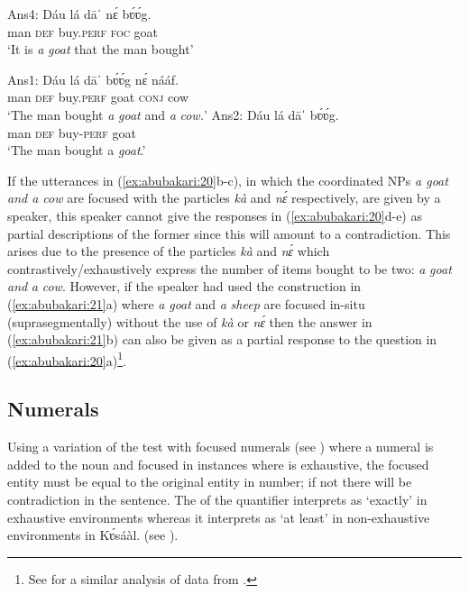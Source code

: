 \documentclass[output=paper
,newtxmath
,modfonts
,nonflat]{langsci/langscibook}
\begin{document}
\ex\label{ex:abubakari:20e}
Ans4: \gll {\#}Dáu  lá  dāˈ    nɛ́  bʋ́ʋ́g.\\   
man  \textsc{def}  buy.\textsc{perf}  \textsc{foc}  goat\\
\glt ‘It is \textit{a} \textit{goat} that the man bought’
\z
\z

\ea\label{ex:abubakari:21}
\ea\label{ex:abubakari:21a}
Ans1: \gll Dáu  lá  dāˈ    bʋ́ʋ́g  nɛ́  nááf.\\
man  \textsc{def}  buy.\textsc{perf}  goat  \textsc{conj}  cow\\                 
\glt ‘The man bought \textit{a} \textit{goat} and \textit{a} \textit{cow.}’     
\ex\label{ex:abubakari:21b}
Ans2: \gll Dáu  lá  dāˈ    bʋ́ʋ́g.\\  
man  \textsc{def}  buy-\textsc{perf}  goat\\  
\glt ‘The man bought {a} \textit{goat}.’
\z
\z

If the utterances in (\ref{ex:abubakari:20}b-c), in which the coordinated NPs \textit{a goat and a cow} are focused with the particles \textit{kà} and \textit{nɛ́} respectively, are given by a speaker, this speaker cannot give the responses in (\ref{ex:abubakari:20}d-e) as partial descriptions of the former since this will amount to a contradiction. This arises due to the presence of the particles \textit{kà} and \textit{nɛ́} which contrastively/exhaustively express the number of items bought to be two: \textit{a} \textit{goat} \textit{and} \textit{a} \textit{cow}. However, if the speaker had used the construction in (\ref{ex:abubakari:21}a) where \textit{a} \textit{goat} and \textit{a} \textit{sheep} are focused in-situ (suprasegmentally) without the use of \textit{kà} or \textit{nɛ́} then the answer in (\ref{ex:abubakari:21}b) can also be given as a partial response to the question in (\ref{ex:abubakari:20}a)\footnote{See \citet{duah2015} for a similar analysis of data from .}. 

\subsection{Numerals}

Using a variation of the  test with focused numerals (see \citealt{szabolcsi1981,ÉKiss1998}) where a numeral is added to the noun and focused in instances where  is exhaustive, the focused entity must be equal to the original entity in number; if not there will be contradiction in the sentence. The  of the quantifier interprets as ‘exactly’ in exhaustive  environments whereas it interprets as ‘at least’ in non-exhaustive environments in Kʋ́sáàl. (see \citealt[155]{szabolcsi1981}).
\end{document}
